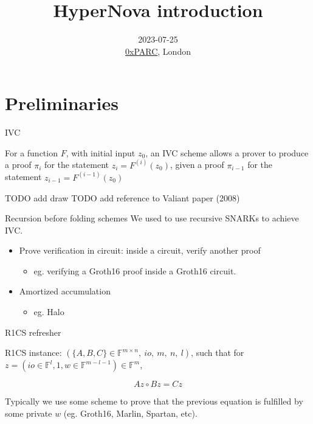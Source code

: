 \documentclass{beamer}
\title{HyperNova introduction}
\author{}
\date{\scriptsize{2023-07-25\\\href{https://0xparc.org}{0xPARC}, London}}
\begin{document}
\frame{\titlepage}




\section[Preliminaries]{Preliminaries}

\begin{frame}{IVC}

For a function $F$, with initial input $z_0$, an IVC scheme allows a prover to produce a proof $\pi_i$ for the statement $z_i = F^{(i)}(z_0)$, given a proof $\pi_{i-1}$ for the statement $z_{i-1} = F^{(i-1)}(z_0)$

TODO add draw
TODO add reference to Valiant paper (2008)

\end{frame}

\begin{frame}{Recursion before folding schemes}
We used to use recursive SNARKs to achieve IVC.

  \begin{itemize}
    \item Prove verification in circuit: inside a circuit, verify another proof
    \begin{itemize}
      \item eg. verifying a Groth16 proof inside a Groth16 circuit.
    \end{itemize}
    \item Amortized accumulation
    \begin{itemize}
      \item eg. Halo
    \end{itemize}
  \end{itemize}
\end{frame}

\begin{frame}{R1CS refresher}

  R1CS instance: $(\{A, B, C\} \in \mathbb{F}^{m \times n},~ io,~ m,~ n,~ l)$, such that for $z=(io \in \mathbb{F}^l, 1, w \in \mathbb{F}^{m-l-1}) \in \mathbb{F}^m$,

$$Az \circ Bz = Cz$$

Typically we use some scheme to prove that the previous equation is fulfilled by some private $w$ (eg. Groth16, Marlin, Spartan, etc).

\end{frame}
\end{document}
